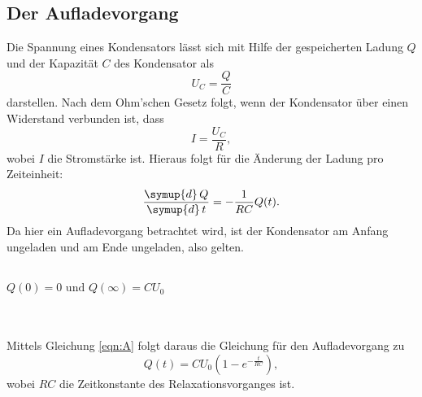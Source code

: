 \subsection{Der Aufladevorgang}
    Die Spannung eines Kondensators lässt sich mit Hilfe der gespeicherten Ladung $Q$ und der Kapazität $C$ des Kondensator als 
    \begin{equation}
        \label{eqn:UC}
        U_C = \frac{Q}{C}
    \end{equation}
    darstellen. Nach dem Ohm'schen Gesetz folgt, wenn der Kondensator über einen Widerstand verbunden ist, dass
    \begin{equation}
        \label{eqn:strom}
        I = \frac{U_C}{R},
    \end{equation}
    wobei $I$ die Stromstärke ist. Hieraus folgt für die Änderung der Ladung pro Zeiteinheit:
    \begin{equation}
        \label{eqn:ladung}
        \frac{\symup{d} \, Q}{\symup{d} \, t} = - \frac{1}{RC} Q(t).
    \end{equation}
    Da hier ein Aufladevorgang betrachtet wird, ist der Kondensator am Anfang ungeladen und am Ende ungeladen, also gelten.
    \\ \\
    \centerline{$Q(0) = 0 \text{ und } Q(\infty)  = C U_0$}
    \\ \\
    Mittels Gleichung \eqref{eqn:A} folgt daraus die Gleichung für den Aufladevorgang zu
    \begin{equation}
        \label{eqn:aufladung}
        Q(t) = C U_0 (1 - e^{-\frac{t}{RC}} ),
    \end{equation}
    wobei $RC$ die Zeitkonstante des Relaxationsvorganges ist.    
 
